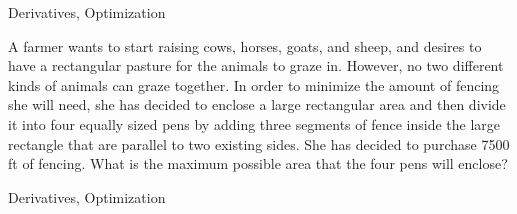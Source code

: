 
\begin{tagblock}{Derivatives, Optimization}

\begin{question}

A farmer wants to start raising cows, horses, goats, and sheep, and desires to have a rectangular pasture for the animals to graze in. However, no two different kinds of animals can graze together. In order to minimize the amount of fencing she will need, she has decided to enclose a large rectangular area and then divide it into four equally sized pens by adding three segments of fence inside the large rectangle that are parallel to two existing sides. She has decided to purchase 7500 ft of fencing. What is the maximum possible area that the four pens will enclose?


	
\begin{tags}
	   Derivatives, Optimization

\end{tags}
	
\begin{diary}
\end{diary}
	
\begin{solution}
	   
\end{solution}
	
\end{question}

\end{tagblock}


